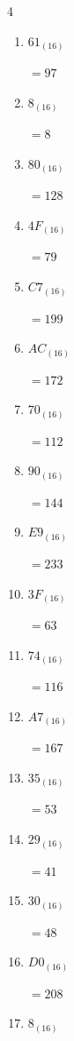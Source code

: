 \begin{multicols}{4}
\begin{enumerate}
  \item $61_{(16)}$

        $=97$

  \item $8_{(16)}$

        $=8$

  \item $80_{(16)}$

        $=128$

  \item $4F_{(16)}$

        $=79$

  \item $C7_{(16)}$

        $=199$

  \item $AC_{(16)}$

        $=172$

  \item $70_{(16)}$

        $=112$

  \item $90_{(16)}$

        $=144$

  \item $E9_{(16)}$

        $=233$

\columnbreak %

  \item $3F_{(16)}$

        $=63$

  \item $74_{(16)}$

        $=116$

  \item $A7_{(16)}$

        $=167$

  \item $35_{(16)}$

        $=53$

  \item $29_{(16)}$

        $=41$

  \item $30_{(16)}$

        $=48$

  \item $D0_{(16)}$

        $=208$

  \item $8_{(16)}$


\end{enumerate}
\end{multicols}
